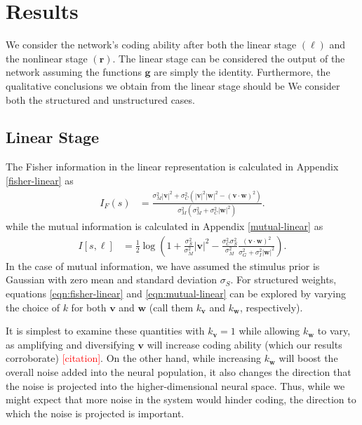 \documentclass[11pt]{article}
\begin{document}
	\section{Results}
	We consider the network's coding ability after both the linear stage $(\boldsymbol{\ell})$ and the nonlinear stage $(\mathbf{r})$. The linear stage can be considered the output of the network assuming the functions $\mathbf{g}$ are simply the identity. Furthermore, the qualitative conclusions we obtain from the linear stage should be  We consider both the structured and unstructured cases.
	\subsection{Linear Stage}
	The Fisher information in the linear representation is calculated in Appendix \ref{fisher-linear} as 
	\begin{align}
		I_F(s) &= \frac{\sigma_M^2 |\mathbf{v}|^2 + \sigma_C^2 \left(|\mathbf{v}|^2|\mathbf{w}|^2 - (\mathbf{v}\cdot\mathbf{w})^2\right)}{\sigma_M^2 (\sigma_M^2 + \sigma_C^2 |\mathbf{w}|^2)}. \label{eqn:fisher-linear}
	\end{align}
	while the mutual information is calculated in Appendix \ref{mutual-linear} as
	\begin{align}
		I[s, \boldsymbol{\ell}] &= \frac{1}{2} \log \left(1 + \frac{\sigma_S^2}{\sigma_M^2} |\mathbf{v}|^2 - \frac{\sigma_C^2 \sigma_S^2}{\sigma_M^2} \frac{(\mathbf{v}\cdot\mathbf{w})^2}{\sigma_G^2 + \sigma_I^2 |\mathbf{w}|^2}\right). \label{eqn:mutual-linear}
	\end{align}
	In the case of mutual information, we have assumed the stimulus prior is Gaussian with zero mean and standard deviation $\sigma_S$. For structured weights, equations \ref{eqn:fisher-linear} and \ref{eqn:mutual-linear} can be explored by varying the choice of $k$ for both $\mathbf{v}$ and $\mathbf{w}$ (call them $k_{\mathbf{v}}$ and $k_{\mathbf{w}}$, respectively).
	
	It is simplest to examine these quantities with $k_{\mathbf{v}}=1$ while allowing $k_{\mathbf{w}}$ to vary, as amplifying and diversifying $\mathbf{v}$ will increase coding ability (which our results corroborate) \textcolor{red}{[citation]}. On the other hand, while increasing $k_{\mathbf{w}}$ will boost the overall noise added into the neural population, it also changes the direction that the noise is projected into the higher-dimensional neural space. Thus, while we might expect that more noise in the system would hinder coding, the direction to which the noise is projected is important. 
	
\end{document}
